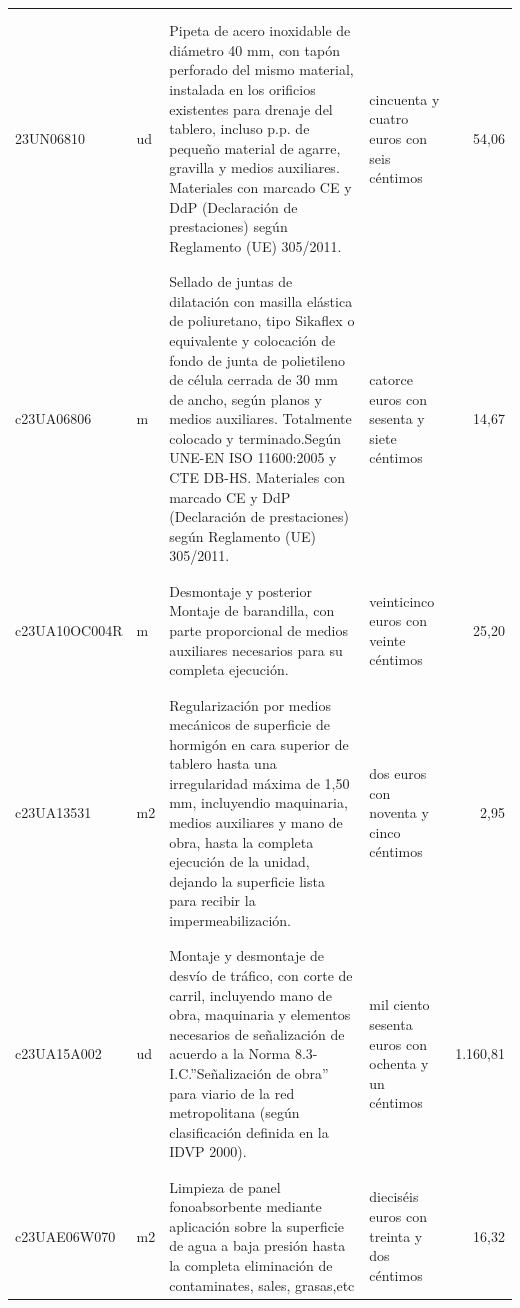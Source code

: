 \documentclass{book}%
\begin{document}
\begin{supertabular}{|l|l|p{5cm}|p{3cm}|r|}
&&&&\\%
&&&&\\%
23UN06810&ud&Pipeta de acero inoxidable de diámetro 40 mm, con tapón perforado del mismo material, instalada en los orificios existentes para drenaje del tablero, incluso p.p. de pequeño material de agarre, gravilla y medios auxiliares. Materiales con marcado CE y DdP (Declaración de prestaciones) según Reglamento (UE) 305/2011.&cincuenta y cuatro euros con seis céntimos&54,06\\%
&&&&\\%
&&&&\\%
c23UA06806&m&Sellado de juntas de dilatación con masilla elástica de poliuretano, tipo Sikaflex o equivalente y colocación de fondo de junta de polietileno de célula cerrada de 30 mm de ancho, según planos y medios auxiliares. Totalmente colocado y terminado.Según UNE{-}EN ISO 11600:2005 y CTE DB{-}HS. Materiales con marcado CE y DdP (Declaración de prestaciones) según Reglamento (UE) 305/2011.&catorce euros con sesenta y siete céntimos&14,67\\%
&&&&\\%
&&&&\\%
c23UA10OC004R&m&Desmontaje y posterior Montaje de barandilla, con parte proporcional de medios auxiliares necesarios para su completa ejecución.&veinticinco euros con veinte céntimos&25,20\\%
&&&&\\%
&&&&\\%
c23UA13531&m2&Regularización por medios mecánicos de superficie de hormigón en cara superior de tablero hasta una irregularidad máxima de 1,50 mm, incluyendio maquinaria, medios auxiliares y mano de obra, hasta la completa ejecución de la unidad, dejando la superficie lista para recibir la impermeabilización.&dos euros con noventa y cinco céntimos&2,95\\%
&&&&\\%
&&&&\\%
c23UA15A002&ud&Montaje y desmontaje de desvío de tráfico, con corte de carril, incluyendo mano de obra, maquinaria y elementos necesarios de señalización de acuerdo a la Norma 8.3{-}I.C.”Señalización de obra” para viario de la red metropolitana (según clasificación definida en la IDVP 2000).&mil ciento sesenta euros con ochenta y un céntimos&1.160,81\\%
&&&&\\%
&&&&\\%
c23UAE06W070&m2&Limpieza de panel fonoabsorbente mediante aplicación sobre la superficie de agua a baja presión hasta la completa eliminación de contaminates, sales, grasas,etc &dieciséis euros con treinta y dos céntimos&16,32\\%

\end{supertabular}
\end{document}
